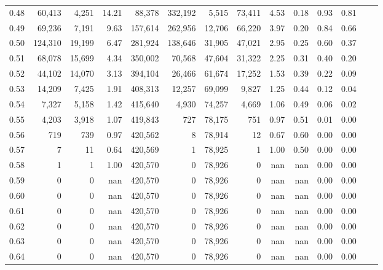 \begin{tabular}{rrrrrrrrrrrrrr}
0.48 &   60,413 &   4,251 &   14.21 &   88,378 &  332,192 &   5,515 &  73,411 &  4.53 &  0.18 &  0.93 &      0.81 \\
0.49 &   69,236 &   7,191 &    9.63 &  157,614 &  262,956 &  12,706 &  66,220 &  3.97 &  0.20 &  0.84 &      0.66 \\
0.50 &  124,310 &  19,199 &    6.47 &  281,924 &  138,646 &  31,905 &  47,021 &  2.95 &  0.25 &  0.60 &      0.37 \\
0.51 &   68,078 &  15,699 &    4.34 &  350,002 &   70,568 &  47,604 &  31,322 &  2.25 &  0.31 &  0.40 &      0.20 \\
0.52 &   44,102 &  14,070 &    3.13 &  394,104 &   26,466 &  61,674 &  17,252 &  1.53 &  0.39 &  0.22 &      0.09 \\
0.53 &   14,209 &   7,425 &    1.91 &  408,313 &   12,257 &  69,099 &   9,827 &  1.25 &  0.44 &  0.12 &      0.04 \\
0.54 &    7,327 &   5,158 &    1.42 &  415,640 &    4,930 &  74,257 &   4,669 &  1.06 &  0.49 &  0.06 &      0.02 \\
0.55 &    4,203 &   3,918 &    1.07 &  419,843 &      727 &  78,175 &     751 &  0.97 &  0.51 &  0.01 &      0.00 \\
0.56 &      719 &     739 &    0.97 &  420,562 &        8 &  78,914 &      12 &  0.67 &  0.60 &  0.00 &      0.00 \\
0.57 &        7 &      11 &    0.64 &  420,569 &        1 &  78,925 &       1 &  1.00 &  0.50 &  0.00 &      0.00 \\
0.58 &        1 &       1 &    1.00 &  420,570 &        0 &  78,926 &       0 &   nan &   nan &  0.00 &      0.00 \\
0.59 &        0 &       0 &     nan &  420,570 &        0 &  78,926 &       0 &   nan &   nan &  0.00 &      0.00 \\
0.60 &        0 &       0 &     nan &  420,570 &        0 &  78,926 &       0 &   nan &   nan &  0.00 &      0.00 \\
0.61 &        0 &       0 &     nan &  420,570 &        0 &  78,926 &       0 &   nan &   nan &  0.00 &      0.00 \\
0.62 &        0 &       0 &     nan &  420,570 &        0 &  78,926 &       0 &   nan &   nan &  0.00 &      0.00 \\
0.63 &        0 &       0 &     nan &  420,570 &        0 &  78,926 &       0 &   nan &   nan &  0.00 &      0.00 \\
0.64 &        0 &       0 &     nan &  420,570 &        0 &  78,926 &       0 &   nan &   nan &  0.00 &      0.00 \\

\end{tabular}
